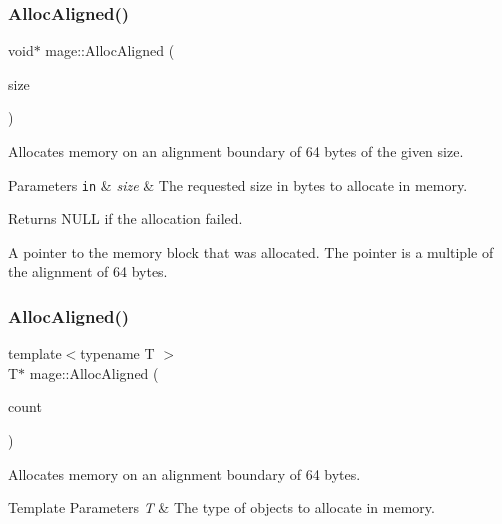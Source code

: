 \subsubsection{\texorpdfstring{Alloc\+Aligned()}{AllocAligned()}\hspace{0.1cm}{\footnotesize\ttfamily [1/2]}}
{\footnotesize\ttfamily void$\ast$ mage\+::\+Alloc\+Aligned (\begin{DoxyParamCaption}\item[{size\+\_\+t}]{size }\end{DoxyParamCaption})}

Allocates memory on an alignment boundary of 64 bytes of the given size.


\begin{DoxyParams}[1]{Parameters}
\mbox{\tt in}  & {\em size} & The requested size in bytes to allocate in memory. \\
\hline
\end{DoxyParams}
\begin{DoxyReturn}{Returns}
{\ttfamily N\+U\+LL} if the allocation failed. 

A pointer to the memory block that was allocated. The pointer is a multiple of the alignment of 64 bytes. 
\end{DoxyReturn}
\hypertarget{namespacemage_ae2f31ba64620694aa0dfc8ca6e5d5941}{}\label{namespacemage_ae2f31ba64620694aa0dfc8ca6e5d5941} 
\subsubsection{\texorpdfstring{Alloc\+Aligned()}{AllocAligned()}\hspace{0.1cm}{\footnotesize\ttfamily [2/2]}}
{\footnotesize\ttfamily template$<$typename T $>$ \\
T$\ast$ mage\+::\+Alloc\+Aligned (\begin{DoxyParamCaption}\item[{uint32\+\_\+t}]{count }\end{DoxyParamCaption})}

Allocates memory on an alignment boundary of 64 bytes.


\begin{DoxyTemplParams}{Template Parameters}
{\em T} & The type of objects to allocate in memory. \\
\hline
\end{DoxyTemplParams}

